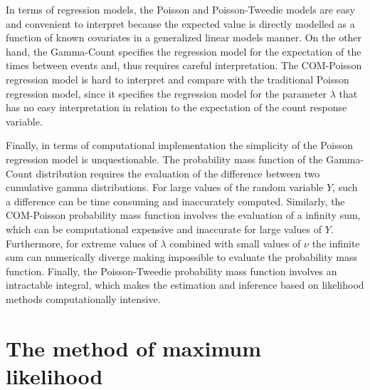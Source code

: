 \documentclass[9pt,a5paper,]{book}
\theoremstyle{definition}
\theoremstyle{definition}
\theoremstyle{remark}
\begin{document}
In terms of regression models, the Poisson and Poisson-Tweedie models
are easy and convenient to interpret because the expected value is
directly modelled as a function of known covariates in a generalized
linear models manner. On the other hand, the Gamma-Count specifies the
regression model for the expectation of the times between events and,
thus requires careful interpretation. The COM-Poisson regression model
is hard to interpret and compare with the traditional Poisson regression
model, since it specifies the regression model for the parameter
\(\lambda\) that has no easy interpretation in relation to the
expectation of the count response variable.

Finally, in terms of computational implementation the simplicity of the
Poisson regression model is unquestionable. The probability mass
function of the Gamma-Count distribution requires the evaluation of the
difference between two cumulative gamma distributions. For large values
of the random variable \(Y\), such a difference can be time consuming
and inaccurately computed. Similarly, the COM-Poisson probability mass
function involves the evaluation of a infinity sum, which can be
computational expensive and inaccurate for large values of \(Y\).
Furthermore, for extreme values of \(\lambda\) combined with small
values of \(\nu\) the infinite sum can numerically diverge making
impossible to evaluate the probability mass function. Finally, the
Poisson-Tweedie probability mass function involves an intractable
integral, which makes the estimation and inference based on likelihood
methods computationally intensive.

\chapter{The method of maximum likelihood}\label{likelihood}
\end{document}
